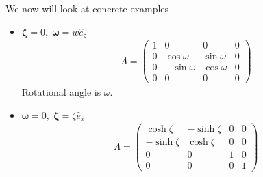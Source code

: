 We now will look at concrete examples
\begin{itemize}
   \item $\pmb{\zeta} = 0,\; \pmb{\omega} = w \hat{e}_z$
      \begin{align*}
         \Lambda = \begin{pmatrix} 1 & 0 & 0 & 0 \\ 0 & \cos{\omega} & \sin{\omega} & 0 \\ 0 & -\sin{\omega} & \cos{\omega} & 0 \\ 0 & 0 & 0 & 0\end{pmatrix}
      \end{align*}
      Rotational angle is $\omega$.
   \item $\pmb{\omega} = 0, \; \pmb{\zeta} = \zeta \hat{e}_x$
      \begin{align*}
         \Lambda = \begin{pmatrix} \cosh{\zeta} & -\sinh{\zeta} & 0 & 0 \\ -\sinh{\zeta} & \cosh{\zeta} & 0 & 0 \\ 0 & 0 & 1 & 0 \\ 0 & 0 & 0 & 1\end{pmatrix}
      \end{align*}
\end{itemize}

